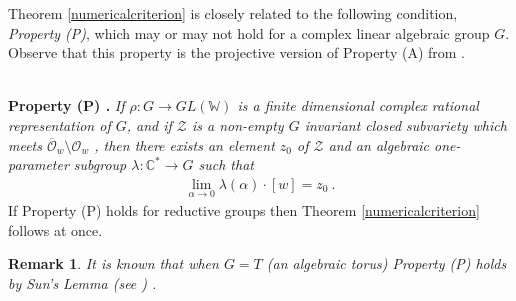 \documentclass[12pt]{amsart}
\newtheorem{remark}{Remark}
\numberwithin{equation}{section}
\numberwithin{remark}{section}
\numberwithin{theorem}{section}
\numberwithin{proposition}{section}
\numberwithin{definition}{section}
\numberwithin{lemma}{section}
\numberwithin{claim}{section}
\numberwithin{corollary}{section}
\numberwithin{conjecture}{section}
\begin{document}
   Theorem \ref{numericalcriterion} is closely related to the following condition, \emph{Property (P)}, which may or may not hold for a complex linear algebraic group $G$. Observe that this property is the projective version of  Property (A) from \cite{birkes71}. 
   

\ \\   
\noindent \textbf{Property (P) .}  \emph{ If $\rho:G{\ensuremath{\longrightarrow}} GL(\mathbb{W})$ is a finite dimensional complex rational representation of $G$, and if $\mathscr{Z}$ is a non-empty $G$ invariant closed subvariety which meets $\overline{\mathcal{O}}_w\setminus {\mathcal{O}}_w$ , then there exists an element $z_0$ of  $\mathscr{Z}$ and an algebraic one-parameter subgroup $\lambda:\mathbb{C}^*{\ensuremath{\longrightarrow}} G$ such that}
\begin{align}
\lim_{\alpha{\ensuremath{\longrightarrow}} 0}\lambda(\alpha)\cdot [w]=z_0 \ .
\end{align}
If Property (P) holds for reductive groups then Theorem \ref{numericalcriterion} follows at once. 
\begin{remark}
\emph{It is known that when $G=T$ (an algebraic torus) Property (P) holds by Sun's Lemma (see \cite{paul2011}) .}
\end{remark}
\end{document}
